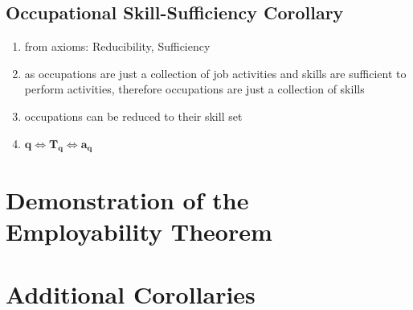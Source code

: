 \documentclass{elsarticle} %
\begin{document}
\subsection{Occupational Skill-Sufficiency Corollary}
\begin{enumerate}
    \item from axioms: Reducibility, Sufficiency
    \item as occupations are just a collection of job activities and skills are
          sufficient to perform activities, therefore occupations are just a collection
          of skills
    \item occupations can be reduced to their skill set
    \item $\boldsymbol{q} \iff \boldsymbol{T_q} \iff \boldsymbol{a_q}$
\end{enumerate}


\section{Demonstration of the Employability Theorem}


\section{Additional Corollaries}
\end{document}
